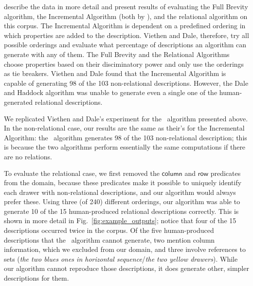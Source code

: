  describe the data in
more detail and present results of evaluating the Full Brevity
algorithm, the Incremental Algorithm (both by ), and
the relational algorithm \cite{dale91:_gener_refer_expres_invol_relat}
on this corpus. The Incremental Algorithm is dependent on a predefined
ordering in which properties are added to the description. Viethen and
Dale, therefore, try all possible orderings and evaluate what
percentage of descriptions an algorithm can generate with any of
them. The Full Brevity and the Relational Algorithms choose properties
based on their disciminatory power and only use the orderings as tie
breakers. Viethen and Dale found that the Incremental Algorithm is
capable of generating 98 of the 103 non-relational
descriptions. However, the Dale and Haddock algorithm was unable to
generate even a single one of the human-generated relational
descriptions.




We replicated Viethen and Dale's experiment for the \el\ algorithm
presented above. In the non-relational case, our results are the same
as their's for the Incremental Algorithm: the \el\ algorithm generates
98 of the 103 non-relational description; this is because the two
algorithms perform essentially the same computations if there are no
relations.


To evaluate the relational case, we first removed the
$\mathsf{column}$ and $\mathsf{row}$ predicates from the domain,
because these predicates make it possible to uniquely identify each
drawer with non-relational descriptions, and our algorithm would
always prefer these.  Using three (of 240) different orderings, our
algorithm was able to generate 10 of the 15 human-produced relational
descriptions correctly.  This is shown in more detail in
Fig.~\ref{fig:example_outputs}; notice that four of the 15
descriptions occurred twice in the corpus.  Of the five human-produced
descriptions that the \el\ algorithm cannot generate, two mention
column information, which we excluded from our domain, and three
involve references to sets (\textit{the two blues ones in horizontal
sequence}/\textit{the two yellow drawers}). While our algorithm cannot
reproduce those descriptions, it does generate other, simpler
descriptions for them.








